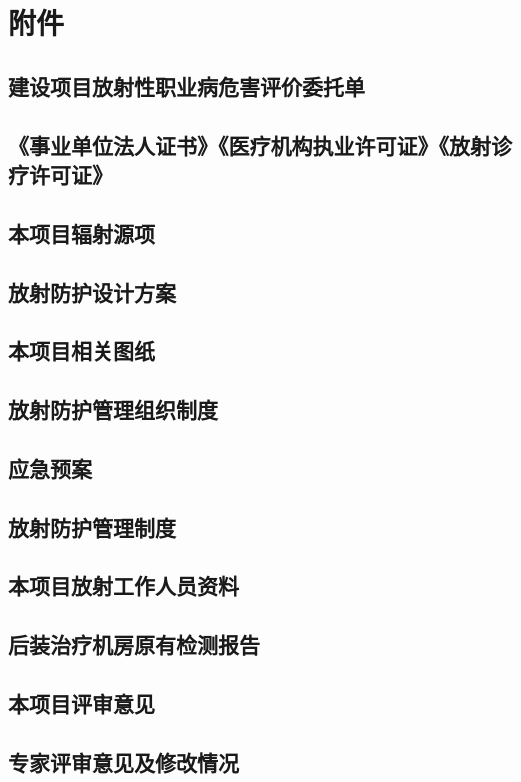 \clearpage
{}
{}

\renewcommand{\thechapter}{}
\setcounter{chapter}{0}
\renewcommand{\thesection}{附件\arabic{section}}
\setcounter{section}{0}

\chapter*{附件}

\section{建设项目放射性职业病危害评价委托单}

\section{《事业单位法人证书》《医疗机构执业许可证》《放射诊疗许可证》}

\section{本项目辐射源项}

\section{放射防护设计方案}

\section{本项目相关图纸}

\section{放射防护管理组织制度}

\section{应急预案}

\section{放射防护管理制度}

\section{本项目放射工作人员资料}

\section{后装治疗机房原有检测报告}

\section{本项目评审意见}

\section{专家评审意见及修改情况}
